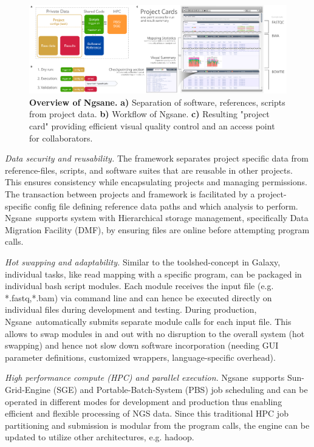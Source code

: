 \documentclass{bioinfo}
\newcommand{\prog}{{\sc Ngsane}}
\begin{document}
\begin{figure}[tbh]
    \centering
   \includegraphics[type=pdf,ext=.pdf,read=.pdf, scale=0.18]{images/web_screens}
    \caption{
      {\bf Overview of \prog .} {\bf a)} Separation of software, references, scripts from project data.  {\bf b)} Workflow of \prog . {\bf c)} Resulting "project card" providing efficient visual quality control and an access point for collaborators.} 
      \label{fig:overview}
\end{figure}

{\it Data security and reusability.}
The framework separates project specific data from reference-files, scripts, and software suites that are reusable in other projects. 
This ensures consistency while encapsulating projects and managing permissions. 
The transaction between projects and framework is facilitated by a project-specific config file defining reference data paths and which analysis to perform. 
\prog\ supports system with Hierarchical storage management, specifically Data Migration Facility (DMF), by ensuring files are online before attempting program calls. 

{\it Hot swapping and adaptability.}
Similar to the toolshed-concept in {\sc Galaxy}, individual tasks, like read mapping with a specific program, can be packaged in individual bash script modules.
Each module receives the input file (e.g. *.fastq,*.bam) via command line and can hence be executed directly on individual files during development and testing.
During production, \prog\ automatically submits separate module calls for each input file. 
This allows to swap modules in and out with no disruption to the overall system (hot swapping) and hence not slow down software incorporation (needing GUI parameter definitions, customized wrappers, language-specific overhead).

{\it High performance compute (HPC) and parallel execution.} 
\prog\ supports Sun-Grid-Engine (SGE) and Portable-Batch-System (PBS) job scheduling and can be operated in different modes for development and production thus enabling efficient and flexible processing of NGS data. 
Since this traditional HPC job partitioning and submission is modular from the program calls, the engine can be updated to utilize other architectures, e.g. hadoop. 
\end{document}

